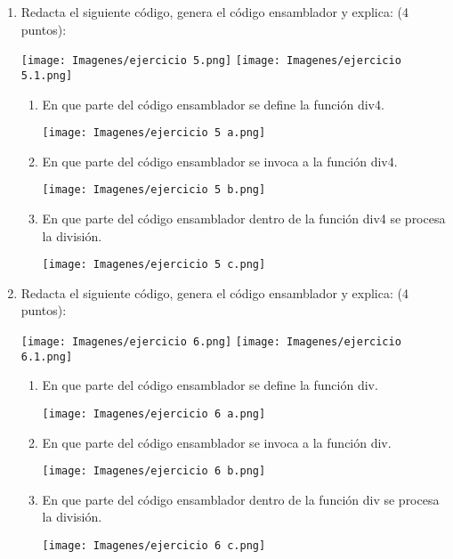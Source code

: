 \documentclass{article}
\begin{document}
\begin{enumerate}
        \item Redacta el siguiente código, genera el código ensamblador y explica: (4 puntos):
        \begin{center}
            \texttt{[image: Imagenes/ejercicio 5.png]}
            \texttt{[image: Imagenes/ejercicio 5.1.png]}
        \end{center}
        \begin{enumerate}
            \item En que parte del código ensamblador se define la función div4.
                \begin{center}
		              \texttt{[image: Imagenes/ejercicio 5 a.png]}
		        \end{center}
            \item En que parte del código ensamblador se invoca a la función div4.
                \begin{center}
		              \texttt{[image: Imagenes/ejercicio 5 b.png]}
		        \end{center}\newpage
            \item En que parte del código ensamblador dentro de la función div4 se procesa la división.
                \begin{center}
		              \texttt{[image: Imagenes/ejercicio 5 c.png]}
		        \end{center}
        \end{enumerate} 

        \item Redacta el siguiente código, genera el código ensamblador y explica: (4 puntos):
            \begin{center}
                \texttt{[image: Imagenes/ejercicio 6.png]}
                \texttt{[image: Imagenes/ejercicio 6.1.png]}
            \end{center}\newpage
        \begin{enumerate}
            \item En que parte del código ensamblador se define la función div.
            \begin{center}
		              \texttt{[image: Imagenes/ejercicio 6 a.png]}
		        \end{center}
            \item En que parte del código ensamblador se invoca a la función div.
            \begin{center}
		              \texttt{[image: Imagenes/ejercicio 6 b.png]}
		        \end{center}
            \item En que parte del código ensamblador dentro de la función div se procesa la división.
            \begin{center}
		              \texttt{[image: Imagenes/ejercicio 6 c.png]}
		        \end{center}
        \end{enumerate} 


\end{enumerate}
\end{document}
